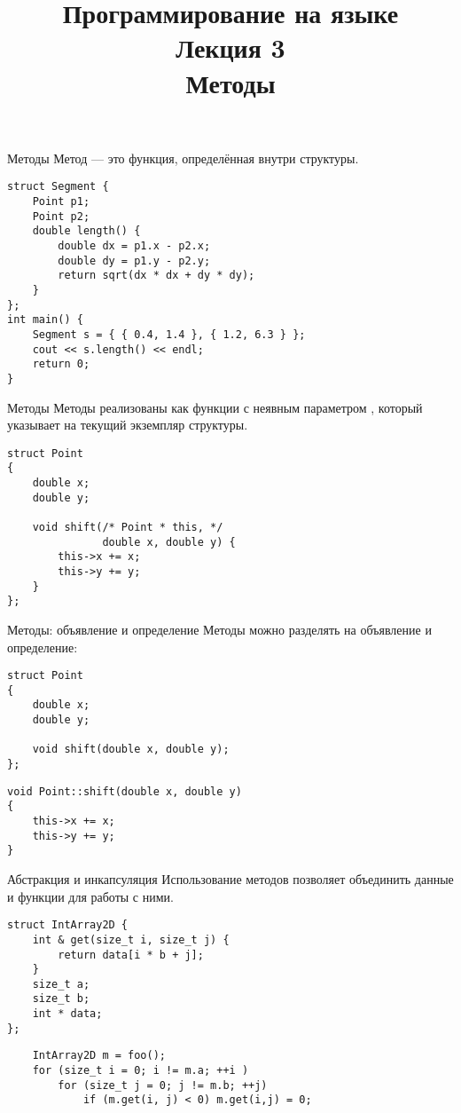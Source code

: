 \documentclass{beamer}
\title{{\bf Программирование на языке \langcpp\protect\\Лекция
3\protect\vspace{1em}\\}Методы}
\begin{document}
\begin{frame} 
  \titlepage
\end{frame}

\begin{frame}[fragile]{Методы}
    Метод — это функция, определённая внутри структуры.
\small
\begin{lstlisting}
struct Segment {
    Point p1;
    Point p2;
    double length() {
        double dx = p1.x - p2.x;
        double dy = p1.y - p2.y;
        return sqrt(dx * dx + dy * dy);
    }
};
int main() {
    Segment s = { { 0.4, 1.4 }, { 1.2, 6.3 } };
    cout << s.length() << endl;
    return 0;
}
\end{lstlisting}
\end{frame}                            

\begin{frame}[fragile]{Методы}
    Методы реализованы как функции с неявным параметром ,
    который указывает на текущий экземпляр структуры.
\small
\begin{lstlisting}
struct Point 
{
    double x;
    double y;

    void shift(/* Point * this, */
               double x, double y) {
        this->x += x;
        this->y += y;        
    }
};
\end{lstlisting}
\end{frame}                            

\begin{frame}[fragile]{Методы: объявление и определение}
    Методы можно разделять на объявление и определение:
\begin{lstlisting}
struct Point 
{
    double x;
    double y;

    void shift(double x, double y);
};
\end{lstlisting}

\begin{lstlisting}
void Point::shift(double x, double y) 
{
    this->x += x;
    this->y += y;        
}
\end{lstlisting}
\end{frame}                            

\begin{frame}[fragile]{Абстракция и инкапсуляция}
    Использование методов позволяет объединить данные и функции для работы с ними.
\small
\begin{lstlisting}
struct IntArray2D {
    int & get(size_t i, size_t j) {
        return data[i * b + j];        
    }
    size_t a;
    size_t b;
    int * data;
};
\end{lstlisting}

\begin{lstlisting}
    IntArray2D m = foo();
    for (size_t i = 0; i != m.a; ++i )
        for (size_t j = 0; j != m.b; ++j)
            if (m.get(i, j) < 0) m.get(i,j) = 0;
\end{lstlisting}
\end{frame}
\end{document}
